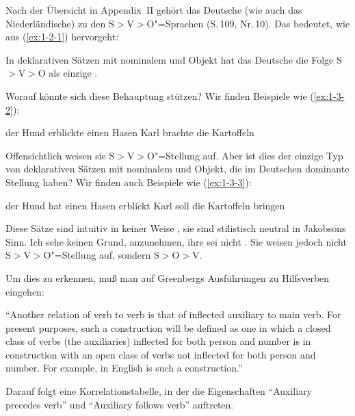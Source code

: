 \documentclass[output=paper]{langsci/langscibook}
\begin{document}
\label{subsec:1-3.1}

\ssubsubsection{}%
\label{subsubsec:1-3.1.1}

Nach der Übersicht in Appendix~II gehört das Deutsche (wie auch das Niederländische) zu den S$>$V$>$O"=Sprachen (S.\,109, Nr.\,10). Das bedeutet, wie aus (\ref{ex:1-2-1}) hervorgeht:
\begin{exe}
\ex\label{ex:1-3-1}
In deklarativen Sätzen mit nominalem  und Objekt hat das Deutsche
die Folge S$>$V$>$O als einzige .
\end{exe}
Worauf könnte sich diese Behauptung stützen? Wir finden Beispiele wie (\ref{ex:1-3-2}):
\begin{exe}
\ex\label{ex:1-3-2}
\begin{xlist}
\ex\label{ex:1-3-2a} der Hund erblickte einen Hasen
\ex\label{ex:1-3-2b} Karl brachte die Kartoffeln
\end{xlist}
\end{exe}
Offensichtlich weisen sie S$>$V$>$O"=Stellung auf. Aber ist dies der einzige Typ von deklarativen Sätzen mit nominalem  und Objekt, die im Deutschen dominante
Stellung haben? Wir finden auch Beispiele wie (\ref{ex:1-3-3}):
\begin{exe}
\ex\label{ex:1-3-3}
\begin{xlist}
\ex\label{ex:1-3-3a} der Hund hat einen Hasen erblickt
\ex\label{ex:1-3-3b} Karl soll die Kartoffeln bringen
\end{xlist}
\end{exe}
Diese Sätze sind intuitiv in keiner Weise , sie sind stilistisch neutral in Jakobsons Sinn. Ich sehe keinen Grund, anzunehmen, ihre  sei nicht . Sie weisen jedoch nicht S$>$V$>$O"=Stellung auf, sondern S$>$O$>$V.

Um dies zu erkennen, muß man auf Greenbergs Ausführungen zu Hilfsverben
eingehen:
\begin{exe}
\ex\label{ex:1-3-4}
"`Another relation of verb to verb is that of inflected auxiliary to
main verb. For present purposes, such a construction will be defined
as one in which a closed class of verbs (the auxiliaries) inflected
for both person and number is in construction with an open class of
verbs not inflected for both person and number. For example, in
English  is such a construction."' \citep[84]{Greenberg1963}
\end{exe}
Darauf folgt eine Korrelationstabelle, in der die Eigenschaften "`Auxiliary precedes
verb"' und "`Auxiliary follows verb"' auftreten.
\end{document}
